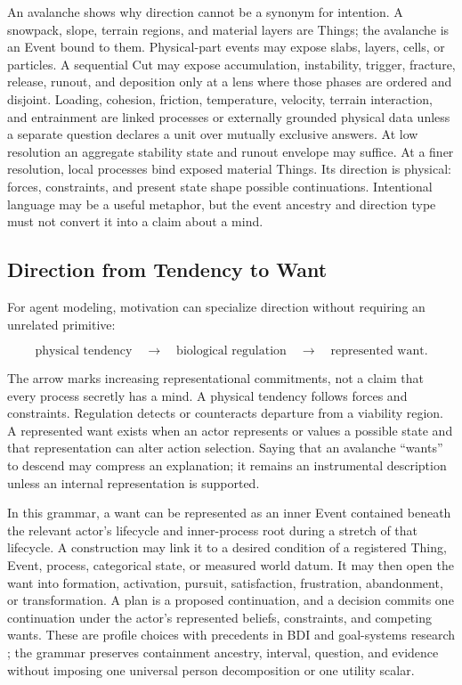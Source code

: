 \documentclass[11pt,a4paper]{article}
\begin{document}
An avalanche shows why direction cannot be a synonym for intention. A
snowpack, slope, terrain regions, and material layers are Things; the avalanche
is an Event bound to them. Physical-part events may expose slabs, layers,
cells, or particles. A sequential Cut may expose accumulation, instability,
trigger, fracture, release, runout, and deposition only at a lens where those
phases are ordered and disjoint. Loading, cohesion, friction, temperature,
velocity, terrain interaction, and entrainment are linked processes or
externally grounded physical data unless a separate question declares a unit
over mutually exclusive answers. At low
resolution an aggregate stability state and runout envelope may suffice. At a
finer resolution, local processes bind exposed material Things. Its direction
is physical: forces, constraints, and present state shape possible
continuations. Intentional language may be a useful metaphor, but the event
ancestry and direction type must not convert it into a claim about a mind.

\subsection{Direction from Tendency to Want}

For agent modeling, motivation can specialize direction without requiring an
unrelated primitive:

\begin{equation}
 \text{physical tendency}\quad\longrightarrow\quad
 \text{biological regulation}\quad\longrightarrow\quad
 \text{represented want}.
 \label{eq:direction-types}
\end{equation}

The arrow marks increasing representational commitments, not a claim that
every process secretly has a mind. A physical tendency follows forces and
constraints. Regulation detects or counteracts departure from a viability
region. A represented want exists when an actor represents or values a
possible state and that representation can alter action selection. Saying that
an avalanche ``wants'' to descend may compress an explanation; it remains an
instrumental description unless an internal representation is supported.

In this grammar, a want can be represented as an inner Event contained beneath
the relevant actor's lifecycle and inner-process root during a stretch of that
lifecycle. A construction may link it to a desired
condition of a registered Thing, Event, process, categorical state, or measured
world datum. It may then open the want into formation, activation, pursuit,
satisfaction, frustration, abandonment, or transformation. A plan is a
proposed continuation, and a decision commits one continuation under the
actor's represented beliefs, constraints, and competing wants. These are
profile choices with precedents in BDI and goal-systems research
\cite{raoGeorgeff1995,kruglanski2002}; the grammar preserves containment
ancestry, interval, question, and evidence without imposing one universal person decomposition or
one utility scalar.
\end{document}
